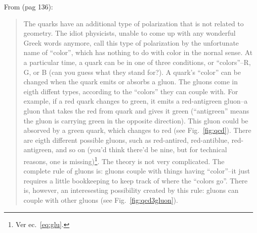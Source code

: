 \begin{frame}
From \cite{Feynman:1986er} (pag 136):
\begin{quote}
  The quarks have an additional type of polarization that is not
  related to geometry. The idiot physicists, unable to come up with
  any wonderful Greek words anymore, call this type of polarization by
  the unfortunate name of ``color'', which has nothing to do with
  color in the nornal sense. At a particular time, a quark can be in
  one of three conditions, or ``colors''--R, G, or B (can you guess
  what they stand for?). A quark's ``color'' can be changed when the
  quark emits or absorbs a gluon. The gluons come in eigth diffent
  types, according to the ``colors'' they can couple with. For
  example, if a red quark changes to green, it emits a red-antigreen
  gluon--a gluon that takes the red from quark and gives it green
  (``antigreen'' means the gluon is carrying green in the opposite
  direction). This gluon could be absorved by a green quark, which
  changes to red (see Fig.~\ref{fig:qcd}). There are eigth different
  possible gluons, such as red-antired, red-antiblue, red-antigreen,
  and so on (you'd think there'd be nine, but for technical reasons,
  one is missing)\footnote{Ver ec.~\ref{eq:glu}.}. The theory is not very complicated.  The complete rule of gluons is: gluons couple with things having ``color''--it just requires a little bookkeeping to keep track of where the ``colors go''.  There is, however, an interesesting possibility created by this rule: gluons can couple with other gluons (see Fig.~\ref{fig:qcd3gluon}).
\end{quote}
\end{frame}



